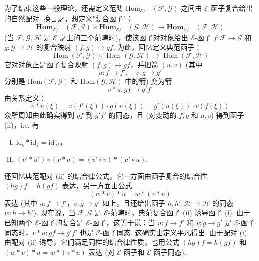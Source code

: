 为了结束这些一般理论，还需定义范畴 Hom$_{\mathcal{E}/-}(\mathcal{F}, \mathcal{G})$ 之间由 $\mathcal{E}$-函子复合给出的自然配对. 换言之，想定义"复合函子"：
\begin{equation}
\mathbf{Hom}_{\mathcal{E}/-}(\mathcal{F}, \mathcal{G}) \times \mathbf{Hom}_{\mathcal{E}/-}(\mathcal{G}, \mathcal{H}) \longrightarrow \mathbf{Hom}_{\mathcal{E}/-}(\mathcal{F}, \mathcal{H}) \tag{i}
\label{eq:VI.i}
\end{equation}
(当 $\mathcal{F}, \mathcal{G}, \mathcal{H}$ 是 $\mathcal{E}$ 之上的三个范畴时)，使该函子对对象给出 $\mathcal{E}$-函子 $f \colon \mathcal{F} \to \mathcal{G}$ 和 $g \colon \mathcal{G} \to \mathcal{H}$ 的复合映射 $(f, g) \mapsto gf$. 为此，回忆定义典范函子：
\begin{equation}
\operatorname{Hom}(\mathcal{F}, \mathcal{G}) \times \operatorname{Hom}(\mathcal{G}, \mathcal{H}) \longrightarrow \operatorname{Hom}(\mathcal{F}, \mathcal{H}) \tag{ii}
\label{eq:VI.ii}
\end{equation}
它对对象正是函子复合映射 $(f, g) \mapsto gf$，并把箭 $(u, v)$ (其中
\[
u \colon f \longrightarrow f', \quad v \colon g \longrightarrow g'
\]
分别是 Hom$(\mathcal{F}, \mathcal{G})$ 和 Hom$(\mathcal{G}, \mathcal{H})$ 中的箭) 变为箭
\[
v * u \colon gf \longrightarrow g'f'
\]
由关系定义：
\[
v * u(\xi) = v(f'(\xi)) \cdot g(u(\xi)) = g'(u(\xi)) \cdot v(f(\xi))
\]
众所周知由此确实得到 $gf$ 到 $g'f'$ 的同态，且 (对变动的 $f, g$ 和 $u, v$) 得到函子 (ii)，i.e. 有
\begin{enumerate}[(I)]
\item $\mathrm{id}_g * \mathrm{id}_f = \mathrm{id}_{gf}$，
\item $(v' * u') \circ (v * u) = (v' \circ v) * (u' \circ u)$.
\end{enumerate}
还回忆典范配对 (ii) 的结合律公式，它一方面由函子复合的结合性 $(hg)f = h(gf)$ 表达，另一方面由公式
\begin{equation}
(w * v) * u = w * (v * u) \tag{III}
\label{eq:VI.III}
\end{equation}
表达 (其中 $u \colon f \to f'$，$v \colon g \to g'$ 如上，且还给出函子 $h, h' \colon \mathcal{H} \to \mathcal{H}$ 的同态 $w \colon h \to h'$). 现在说，当 $\mathcal{F}, \mathcal{G}$ 是 $\mathcal{E}$-范畴时，典范复合函子 (ii) 诱导函子 (i). 由于已知两个 $\mathcal{E}$-函子的复合是 $\mathcal{E}$-函子，这等于说：当 $u \colon f \to f'$ 和 $v \colon g \to g'$ 是 $\mathcal{E}$-函子同态时，$v * u \colon gf \to g'f'$ 也是 $\mathcal{E}$-函子同态. 这确实由定义平凡得出. 由于配对 (i) 由配对 (ii) 诱导，它们满足同样的结合律性质，也用公式 $(hg)f = h(gf)$ 和 $(w * v) * u = w * (v * u)$ 表达 (对 $\mathcal{E}$-函子和 $\mathcal{E}$-函子同态).

